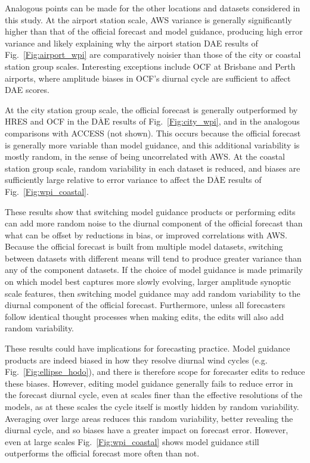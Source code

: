 \documentclass[twocol]{ametsoc}
\begin{document}
Analogous points can be made for the other locations and datasets considered in this study. At the airport station scale, AWS variance is generally significantly higher than that of the official forecast and model guidance, producing high error variance and  likely explaining why the airport station DAE results of Fig.~\ref{Fig:airport_wpi} are comparatively noisier than those of the city or coastal station group scales. Interesting exceptions include OCF at Brisbane and Perth airports, where amplitude biases in OCF's diurnal cycle are sufficient to affect DAE scores.

At the city station group scale, the official forecast is generally outperformed by HRES and OCF in the $\overline{\text{DAE}}$ results of Fig.~\ref{Fig:city_wpi}, and in the analogous comparisons with ACCESS (not shown). This occurs because the official forecast is generally more variable than model guidance, and this additional variability is mostly random, in the sense of being uncorrelated with AWS. At the coastal station group scale, random variability in each dataset is reduced, and biases are sufficiently large relative to error variance to affect the $\overline{\text{DAE}}$ results of Fig.~\ref{Fig:wpi_coastal}.

These results show that switching model guidance products or performing edits can add more random noise to the diurnal component of the official forecast than what can be offset by reductions in bias, or improved correlations with AWS. Because the official forecast is built from multiple model datasets, switching between datasets with different means will tend to produce greater variance than any of the component datasets. If the choice of model guidance is made primarily on which model best captures more slowly evolving, larger amplitude synoptic scale features, then switching model guidance may add random variability to the diurnal component of the official forecast. Furthermore, unless all forecasters follow identical thought processes when making edits, the edits will also add random variability. 

These results could have implications for forecasting practice. Model guidance products are indeed biased in how they resolve diurnal wind cycles (e.g. Fig.~\ref{Fig:ellipse_hodo}), and there is therefore scope for forecaster edits to reduce these biases. However, editing model guidance generally fails to reduce error in the forecast diurnal cycle, even at scales finer than the effective resolutions of the models, as at these scales the cycle itself is mostly hidden by random variability. Averaging over large areas reduces this random variability, better revealing the diurnal cycle, and so biases have a greater impact on forecast error. However, even at large scales Fig.~\ref{Fig:wpi_coastal} shows model guidance still outperforms the official forecast more often than not.
\end{document}
